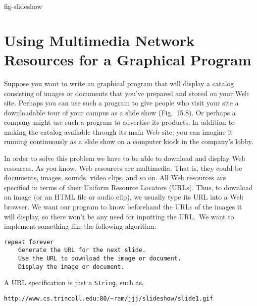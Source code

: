 {fig-slideshow}
\section{Using Multimedia Network Resources for a Graphical Program}
\noindent Suppose you want to write an graphical program that will display a
catalog consisting of images or documents that you've prepared and
stored on your Web site.   Perhaps you can use such a program to give
people who visit your site a downloadable tour of your campus as a
slide show
(Fig.~15.8). Or perhaps a company might use such a
program to advertise its products.  In addition to making the catalog
available through its main Web site, you can imagine it running
continuously as a slide show on a computer kiosk in the company's lobby.


In order to solve this problem we have to be able to download and
display Web resources.   As you know, Web resources are
multimedia.  That is, they could be documents, images, sounds, video
clips, and so on.  All Web resources are specified in terms of their
Uniform Resource Locators (URLs).  Thus, to download an image (or
an HTML file or audio clip), we usually type its URL into a Web
browser.  We want our program to know beforehand the URLs of the
images it will display, so there won't be any need for inputting
the URL.~We want to implement something like the following algorithm:

\begin{jjjlisting}
\begin{lstlisting}
repeat forever
    Generate the URL for the next slide.
    Use the URL to download the image or document.
    Display the image or document.
\end{lstlisting}
\end{jjjlisting}

\noindent A URL specification is just a {\tt String}, such as, 

\begin{jjjlisting}[28pc]
\begin{lstlisting}[commentstyle=\color{black}]
http://www.cs.trincoll.edu:80/~ram/jjj/slideshow/slide1.gif
\end{lstlisting}
\end{jjjlisting}


